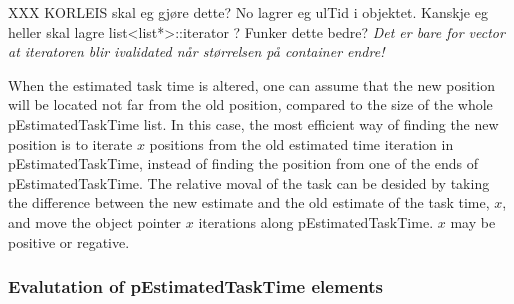 
	XXX KORLEIS skal eg gjøre dette? No lagrer eg ulTid i objektet. Kanskje eg heller skal lagre list<list*>::iterator ? Funker dette bedre?
	\emph{Det er bare for vector at iteratoren blir ivalidated når størrelsen på container endre!}

	When the estimated task time is altered, one can assume that the new position will be located not far from the old position, compared to the size of the whole pEstimatedTaskTime list.
	In this case, the most efficient way of finding the new position is to iterate $x$ positions from the old estimated time iteration in pEstimatedTaskTime, instead of finding the position from one of the ends of pEstimatedTaskTime.
	The relative moval of the task can be desided by taking the difference between the new estimate and the old estimate of the task time, $x$, and move the object pointer $x$ iterations along pEstimatedTaskTime. 
	$x$ may be positive or regative.
	
%




	\subsubsection{Evalutation of pEstimatedTaskTime elements}
	\label{ssecEvaluationOfpEstimatedTaskTimeELEMENTS}

